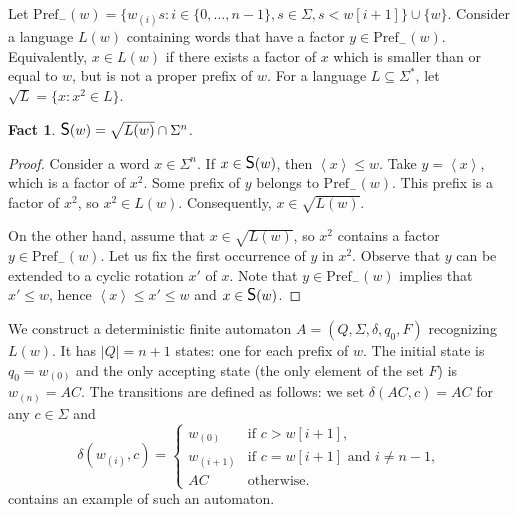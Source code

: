 \documentclass{article}
\newcommand{\mayqed}{}
\newcommand{\sub}{\subseteq}
\newcommand{\CS}{\mbox{\large{\sf{S}}}}
\newcommand{\minrot}[1]{\left\langle #1 \right\rangle}
\newtheorem{fact}[theorem]{Fact}
\theoremstyle{definition}
\theoremstyle{remark}
\begin{document}
\newcommand{\Pref}{\mathrm{Pref}}
Let $\Pref_{-}(w)=\{w_{(i)}s : i\in\{0,\ldots,n-1\},s\in \Sigma, s<w[i+1]\}\cup \{w\}$.
Consider a language $L(w)$ containing words that have a factor $y\in \Pref_{-}(w)$.
Equivalently, $x\in L(w)$ if there exists a factor of $x$ which is smaller than or equal to $w$,
but is not a proper prefix of $w$.
For a language $L\sub \Sigma^*$, let $\sqrt{L} = \{x : x^2 \in L\}$.
\begin{fact}\label{fct:char}
  $\CS(w)=\sqrt{L(w)}\cap \Sigma^{n}$.
\end{fact}
\begin{proof}
  Consider a word $x \in \Sigma^{n}$. 
  If $x \in \CS(w)$, then $\minrot{x}\le w$.
  Take $y=\minrot{x}$, which is a factor of $x^2$.
  Some prefix of $y$ belongs to $\Pref_{-}(w)$.
  This prefix is a factor of $x^2$, so $x^2\in L(w)$.
  Consequently, $x \in \sqrt{L(w)}$.

  On the other hand, assume that $x \in \sqrt{L(w)}$, so $x^2$ contains a factor $y\in \Pref_{-}(w)$.
  Let us fix the first occurrence of $y$ in $x^2$. Observe that $y$ can be extended to a cyclic rotation $x'$ of $x$.
  Note that $y\in \Pref_{-}(w)$ implies that $x'\le w$,
  hence $\minrot{x}\le x'\le w$ and $x \in \CS(w)$.
\mayqed\end{proof}

\noindent
We construct a deterministic finite automaton $A=(Q,\Sigma,\delta,q_0,F)$ recognizing $L(w)$.
It has $|Q|=n+1$ states: one for each prefix of $w$.
The initial state is $q_0 = w_{(0)}$ and the only accepting state (the only element of the set $F$) is $w_{(n)}=AC$.
The transitions are defined as follows: we set $\delta(AC,c)=AC$ for any $c \in \Sigma$ and 
$$
\delta(w_{(i)}, c) = \begin{cases}
w_{(0)}&\text{if }c>w[i+1],\\
w_{(i+1)}&\text{if }c=w[i+1]\text{ and }i\ne n-1,\\
AC&\text{otherwise}.
\end{cases}
$$
 contains an example of such an automaton.
\end{document}
